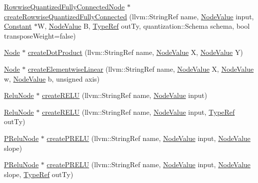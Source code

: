 \begin{DoxyCompactItemize}
\item 
\hyperlink{classglow_1_1_rowwise_quantized_fully_connected_node}{Rowwise\+Quantized\+Fully\+Connected\+Node} $\ast$ \hyperlink{classglow_1_1_function_aa4b45584a08282fd6b027ce972c5f74d}{create\+Rowwise\+Quantized\+Fully\+Connected} (llvm\+::\+String\+Ref name, \hyperlink{structglow_1_1_node_value}{Node\+Value} input, \hyperlink{classglow_1_1_constant}{Constant} $\ast$W, \hyperlink{structglow_1_1_node_value}{Node\+Value} B, \hyperlink{structglow_1_1_type}{Type\+Ref} out\+Ty, quantization\+::\+Schema schema, bool transpose\+Weight=false)
\item 
\hyperlink{classglow_1_1_node}{Node} $\ast$ \hyperlink{classglow_1_1_function_accf9b83116497dd0ac4c3bb730be5153}{create\+Dot\+Product} (llvm\+::\+String\+Ref name, \hyperlink{structglow_1_1_node_value}{Node\+Value} X, \hyperlink{structglow_1_1_node_value}{Node\+Value} Y)
\item 
\hyperlink{classglow_1_1_node}{Node} $\ast$ \hyperlink{classglow_1_1_function_aefc00c1542599ab75332a236d1aee6a3}{create\+Elementwise\+Linear} (llvm\+::\+String\+Ref name, \hyperlink{structglow_1_1_node_value}{Node\+Value} X, \hyperlink{structglow_1_1_node_value}{Node\+Value} w, \hyperlink{structglow_1_1_node_value}{Node\+Value} b, unsigned axis)
\item 
\hyperlink{classglow_1_1_relu_node}{Relu\+Node} $\ast$ \hyperlink{classglow_1_1_function_ada1e5e0678dc0af5c17835ffea6c3367}{create\+R\+E\+LU} (llvm\+::\+String\+Ref name, \hyperlink{structglow_1_1_node_value}{Node\+Value} input)
\item 
\hyperlink{classglow_1_1_relu_node}{Relu\+Node} $\ast$ \hyperlink{classglow_1_1_function_a31145d8863286195749705d53a93b9b0}{create\+R\+E\+LU} (llvm\+::\+String\+Ref name, \hyperlink{structglow_1_1_node_value}{Node\+Value} input, \hyperlink{structglow_1_1_type}{Type\+Ref} out\+Ty)
\item 
\hyperlink{classglow_1_1_p_relu_node}{P\+Relu\+Node} $\ast$ \hyperlink{classglow_1_1_function_a128f705eed37efbbb40cc644c36dd16e}{create\+P\+R\+E\+LU} (llvm\+::\+String\+Ref name, \hyperlink{structglow_1_1_node_value}{Node\+Value} input, \hyperlink{structglow_1_1_node_value}{Node\+Value} slope)
\item 
\hyperlink{classglow_1_1_p_relu_node}{P\+Relu\+Node} $\ast$ \hyperlink{classglow_1_1_function_a87131023c229abbfbc109c06485106a7}{create\+P\+R\+E\+LU} (llvm\+::\+String\+Ref name, \hyperlink{structglow_1_1_node_value}{Node\+Value} input, \hyperlink{structglow_1_1_node_value}{Node\+Value} slope, \hyperlink{structglow_1_1_type}{Type\+Ref} out\+Ty)

\end{DoxyCompactItemize}
